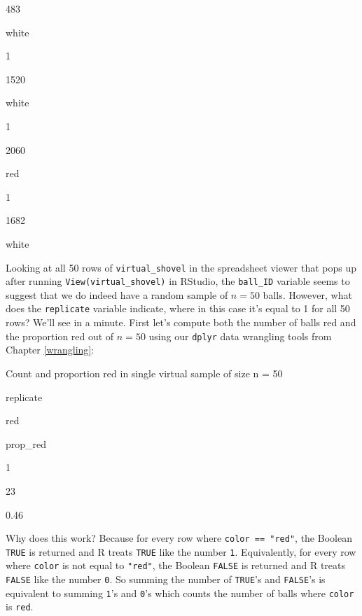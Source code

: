 \documentclass[12pt,]{krantz}
\makeatletter
\newenvironment{Shaded}{\begin{snugshade}}{\end{snugshade}}
\newcommand{\KeywordTok}[1]{\textcolor[rgb]{0.27,0.27,0.27}{\textbf{#1}}}
\newcommand{\DataTypeTok}[1]{\textcolor[rgb]{0.27,0.27,0.27}{#1}}
\newcommand{\DecValTok}[1]{\textcolor[rgb]{0.06,0.06,0.06}{#1}}
\newcommand{\StringTok}[1]{\textcolor[rgb]{0.5,0.5,0.5}{#1}}
\newcommand{\OperatorTok}[1]{\textcolor[rgb]{0.43,0.43,0.43}{\textbf{#1}}}
\newcommand{\NormalTok}[1]{#1}
\newenvironment{kframe}{%
\medskip{}
\setlength{\fboxsep}{.8em}
 \def\at@end@of@kframe{}%
 \ifinner\ifhmode%
  \def\at@end@of@kframe{\end{minipage}}%
  \begin{minipage}{\columnwidth}%
 \fi\fi%
 \def\FrameCommand##1{\hskip\@totalleftmargin \hskip-\fboxsep
 \colorbox{shadecolor}{##1}\hskip-\fboxsep
     \hskip-\linewidth \hskip-\@totalleftmargin \hskip\columnwidth}%
 \MakeFramed {\advance\hsize-\width
   \@totalleftmargin\z@ \linewidth\hsize
   \@setminipage}}%
 {\par\unskip\endMakeFramed%
 \at@end@of@kframe}
\renewenvironment{Shaded}{\begin{kframe}}{\end{kframe}}
\makeatother
\begin{document}
483

white

1

1520

white

1

2060

red

1

1682

white

Looking at all 50 rows of \texttt{virtual\_shovel} in the spreadsheet
viewer that pops up after running \texttt{View(virtual\_shovel)} in
RStudio, the \texttt{ball\_ID} variable seems to suggest that we do
indeed have a random sample of \(n=50\) balls. However, what does the
\texttt{replicate} variable indicate, where in this case it's equal to 1
for all 50 rows? We'll see in a minute. First let's compute both the
number of balls red and the proportion red out of \(n=50\) using our
\texttt{dplyr} data wrangling tools from Chapter \ref{wrangling}:

\begin{Shaded}
\end{Shaded}

\label{tab:unnamed-chunk-268}Count and proportion red in single virtual
sample of size n = 50

replicate

red

prop\_red

1

23

0.46

Why does this work? Because for every row where
\texttt{color\ ==\ "red"}, the Boolean \texttt{TRUE} is returned and R
treats \texttt{TRUE} like the number \texttt{1}. Equivalently, for every
row where \texttt{color} is not equal to \texttt{"red"}, the Boolean
\texttt{FALSE} is returned and R treats \texttt{FALSE} like the number
\texttt{0}. So summing the number of \texttt{TRUE}'s and
\texttt{FALSE}'s is equivalent to summing \texttt{1}'s and \texttt{0}'s
which counts the number of balls where \texttt{color} is \texttt{red}.
\end{document}
